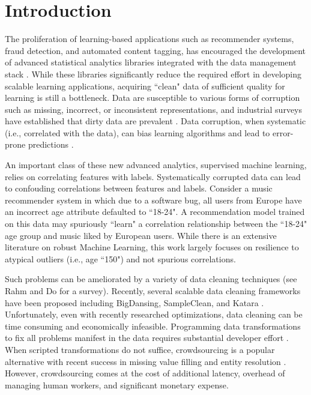 \section{Introduction}
The proliferation of learning-based applications such as recommender systems, fraud detection, and automated content tagging, has encouraged the development of advanced statistical analytics libraries integrated with the data management stack \cite{bdas, alexandrov2014stratosphere, crotty2014tupleware, hellerstein2012madlib}. 
While these libraries significantly reduce the required effort in developing scalable learning applications, acquiring ``clean" data of sufficient quality for learning is still a bottleneck.
Data are susceptible to various forms of corruption such as missing, incorrect, or inconsistent representations, and industrial surveys have established that dirty data are prevalent  \cite{Gartner}.
Data corruption, when systematic \cite{taylor1982introduction} (i.e., correlated with the data), can bias learning algorithms and lead to error-prone predictions \cite{xiaofeature}.

An important class of these new advanced analytics, supervised machine learning, relies on correlating features with labels.
Systematically corrupted data can lead to confouding correlations between features and labels.
Consider a music recommender system in which due to a software bug, all users from Europe have an incorrect age attribute defaulted to ``18-24".
A recommendation model trained on this data may spuriously ``learn" a correlation relationship between the ``18-24" age group and music liked by European users.
While there is an extensive literature on robust Machine Learning, this work largely focuses on resilience to atypical outliers (i.e., age ``150") and not spurious correlations.

Such problems can be ameliorated by a variety of data cleaning techniques (see Rahm and Do \cite{rahm2000data} for a survey).
Recently, several scalable data cleaning frameworks have been proposed including BigDansing\cite{khayyat2015bigdansing}, SampleClean\cite{sampleclean}, and Katara \cite{chu2015katara}. 
Unfortunately, even with recently researched optimizations, data cleaning can be time consuming and economically infeasible\cite{wang1999sample}.
Programming data transformations to fix all problems manifest in the data requires substantial developer effort \cite{kandel2012}.
When scripted transformations do not suffice, crowdsourcing is a popular alternative with recent success in missing value filling and entity resolution \cite{gokhale2014corleone, park2014crowdfill, sampleclean,chu2015katara}.
However, crowdsourcing comes at the cost of additional latency, overhead of managing human workers, and significant monetary expense.

